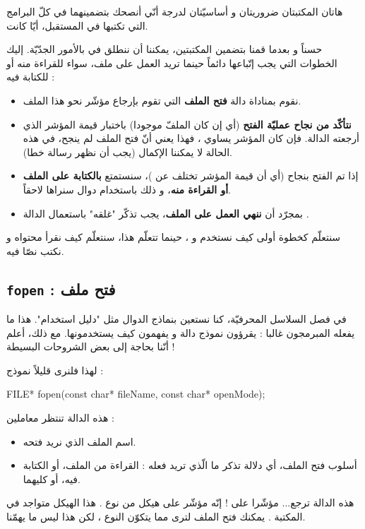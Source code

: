 هاتان المكتبتان ضروريتان و أساسيّتان لدرجة أنّي أنصحك بتضمينهما في كلّ البرامج التي تكتبها في المستقبل، أيّا كانت.

حسناً و بعدما قمنا بتضمين المكتبتين، يمكننا أن ننطلق في بالأمور الجدّيّة. إليك الخطوات التي يجب إتّباعها دائماً حينما تريد العمل على ملف، سواء للقراءة منه أو للكتابة فيه :
\begin{itemize}
  \item نقوم بمناداة دالة
\textbf{فتح الملف}
التي تقوم بإرجاع مؤشّر نحو هذا الملف.
  \item \textbf{نتأكّد من نجاح عمليّة الفتح}
(أي إن كان الملفّ موجودا) باختبار قيمة المؤشر الذي أرجعته الدالة. فإن كان المؤشر يساوي
،
فهذا يعني أنّ فتح الملف لم ينجح، في هذه الحالة لا يمكننا الإكمال (يجب أن نظهر رسالة خطا).
  \item إذا تم الفتح بنجاح (أي أن قيمة المؤشر تختلف عن
)،
سنستمتع
\textbf{بالكتابة على الملف أو القراءة منه}،
و ذلك باستخدام دوال سنراها لاحقاً.
  \item بمجرّد أن
\textbf{ننهي العمل على الملف}،
يجب تذكّر "غلقه" باستعمال الدالة
.
\end{itemize}
سنتعلّم كخطوة أولى كيف نستخدم
و
،
حينما تتعلّم هذا، سنتعلّم كيف نقرأ محتواه و نكتب نصّا فيه.

\subsection{\texttt{fopen} : فتح ملف}
في فصل السلاسل المحرفيّة، كنا نستعين بنماذج الدوال مثل "دليل استخدام". هذا ما يفعله المبرمجون غالبا : يقرؤون نموذج دالة و يفهمون كيف يستخدمونها. مع ذلك، أعلم أنّنا بحاجة إلى بعض الشروحات البسيطة !

لهذا فلنرى قليلاً نموذج
 :

\begin{Csource}
FILE* fopen(const char* fileName, const char* openMode);
\end{Csource}

هذه الدالة تنتظر معاملين :
\begin{itemize}
  \item اسم الملف الذي نريد فتحه.
  \item أسلوب فتح الملف، أي دلالة تذكر ما الّذي تريد فعله : القراءة من الملف، أو الكتابة فيه، أو كليهما.
\end{itemize}

هذه الدالة ترجع... مؤشّرا على
 !
إنّه مؤشّر على هيكل من نوع
.
هذا الهيكل متواجد في المكتبة
.
يمكنك فتح الملف لترى مما يتكوّن النوع
،
لكن هذا ليس ما يهمّنا.

